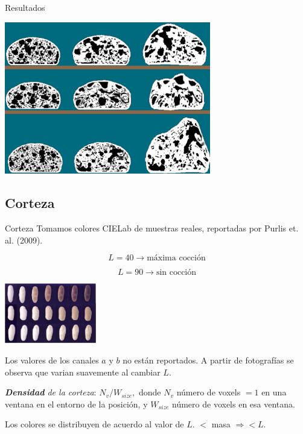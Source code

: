 \documentclass[spanish]{beamer}
\begin{document}
\begin{frame}{Resultados}

\centerline{\includegraphics[width=9cm]{../figures/Fig9}}

\end{frame}

\subsection{Corteza}

\begin{frame}{Corteza}
Tomamos colores CIELab de muestras reales, reportadas por Purlis et. al. (2009).

$$L = 40 \rightarrow \text{máxima cocción}$$

$$L = 90 \rightarrow \text{sin cocción}$$

\centerline{\includegraphics[width=4cm]{../figures/browning}}

\end{frame}

\begin{frame}

Los valores de los canales $a$ y $b$ no están reportados. A partir de fotografías se observa que varian suavemente al cambiar $L$.

{\em \textbf{Densidad} de la corteza}: $N_{v} / W_{size},$ donde $N_{v}$ número de voxels $= 1$ en una ventana en el entorno de la posición, y $W_{size}$ número de voxels en esa ventana.

Los colores se distribuyen de acuerdo al valor de $L$. $<$ masa $\Rightarrow < L$.

\end{frame}
\end{document}
